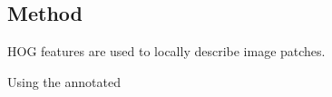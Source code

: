 \subsection{Method}
\label{subsec:pageclasmethod}
HOG \cite{dalal2005histograms} features are used to locally describe image
patches.

Using the annotated 




